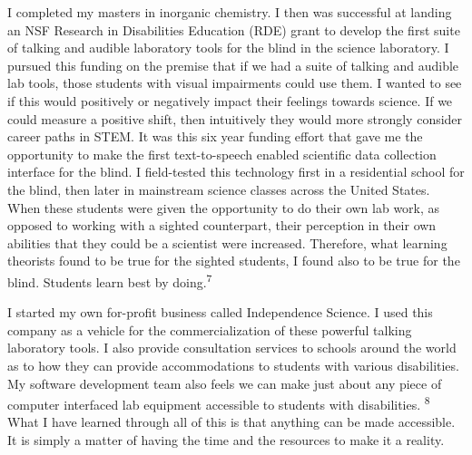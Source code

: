 \documentclass[11.5pt]{sig-alternate} %
\begin{document}
\begin{large}
I completed my masters in inorganic chemistry. I then was successful at landing an NSF Research in Disabilities Education (RDE) grant to develop the first suite of talking and audible laboratory tools for the blind in the science laboratory. I pursued this funding on the premise that if we had a suite of talking and audible lab tools, those students with visual impairments could use them. I wanted to see if this would positively or negatively impact their feelings towards science. If we could measure a positive shift, then intuitively they would more strongly consider career paths in STEM. It was this six year funding effort that gave me the opportunity to make the first text-to-speech enabled scientific data collection interface for the blind. I field-tested this technology first in a residential school for the blind, then later in mainstream science classes across the United States.  When these students were given the opportunity to do their own lab work, as opposed to working with a sighted counterpart, their perception in their own abilities that they could be a scientist were increased.  Therefore, what learning theorists found to be true for the sighted students, I found also to be true for the blind. Students learn best by doing.\textsuperscript{7}

I started my own for-profit business called Independence Science. I used this company as a vehicle for the commercialization of these powerful talking laboratory tools. I also provide consultation services to schools around the world as to how they can provide accommodations to students with various disabilities. My software development team also feels we can make just about any piece of computer interfaced lab equipment accessible to students with disabilities. \textsuperscript{8} What I have learned through all of this is that anything can be made accessible. It is simply a matter of having the time and the resources to make it a reality.


\end{large}
\end{document}

